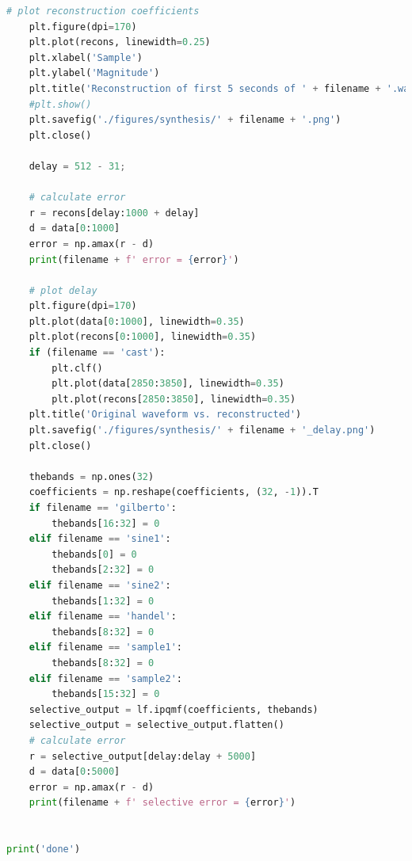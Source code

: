 \documentclass[11pt,a4paper]{article}
\begin{document}
\begin{lstlisting}[language=Python]
    # plot reconstruction coefficients
    plt.figure(dpi=170)
    plt.plot(recons, linewidth=0.25)
    plt.xlabel('Sample')
    plt.ylabel('Magnitude')
    plt.title('Reconstruction of first 5 seconds of ' + filename + '.wav')
    #plt.show()
    plt.savefig('./figures/synthesis/' + filename + '.png')
    plt.close()

    delay = 512 - 31;

    # calculate error
    r = recons[delay:1000 + delay]
    d = data[0:1000]
    error = np.amax(r - d)
    print(filename + f' error = {error}')

    # plot delay
    plt.figure(dpi=170)
    plt.plot(data[0:1000], linewidth=0.35)
    plt.plot(recons[0:1000], linewidth=0.35)
    if (filename == 'cast'):
        plt.clf()
        plt.plot(data[2850:3850], linewidth=0.35)
        plt.plot(recons[2850:3850], linewidth=0.35)
    plt.title('Original waveform vs. reconstructed')
    plt.savefig('./figures/synthesis/' + filename + '_delay.png')
    plt.close()
    
    thebands = np.ones(32)
    coefficients = np.reshape(coefficients, (32, -1)).T
    if filename == 'gilberto':
        thebands[16:32] = 0
    elif filename == 'sine1':
        thebands[0] = 0
        thebands[2:32] = 0
    elif filename == 'sine2':
        thebands[1:32] = 0
    elif filename == 'handel':
        thebands[8:32] = 0
    elif filename == 'sample1':
        thebands[8:32] = 0
    elif filename == 'sample2':
        thebands[15:32] = 0
    selective_output = lf.ipqmf(coefficients, thebands)
    selective_output = selective_output.flatten()
    # calculate error
    r = selective_output[delay:delay + 5000]
    d = data[0:5000]
    error = np.amax(r - d)
    print(filename + f' selective error = {error}')


print('done')

\end{lstlisting}
\end{document}
